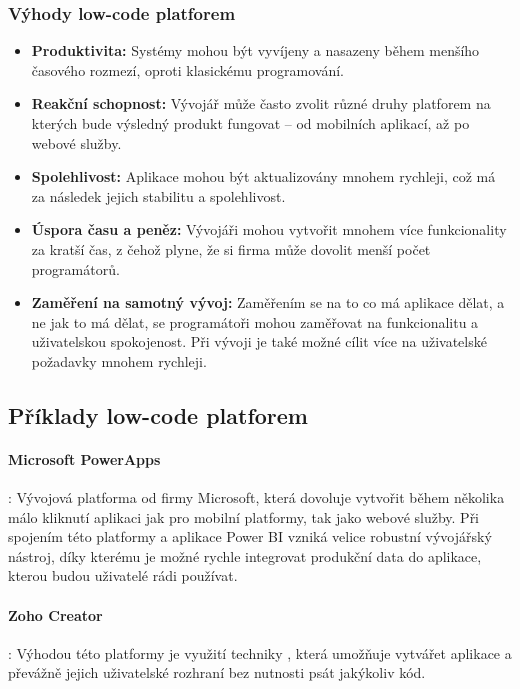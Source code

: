 \subsubsection{Výhody low-code platforem}
\begin{itemize}
\item \textbf{Produktivita:} Systémy mohou být vyvíjeny a nasazeny během menšího časového rozmezí, oproti klasickému programování. \cite{low-code-accelerate}
\item \textbf{Reakční schopnost:} Vývojář může často zvolit různé druhy platforem na kterých bude výsledný produkt fungovat -- od mobilních aplikací, až po webové služby. \cite{low-code-accelerate}
\item \textbf{Spolehlivost:} Aplikace mohou být aktualizovány mnohem rychleji, což má za následek jejich stabilitu a spolehlivost. \cite{low-code-accelerate}
\item \textbf{Úspora času a peněz:} Vývojáři mohou vytvořit mnohem více funkcionality za kratší čas, z čehož plyne, že si firma může dovolit menší počet programátorů. \cite{low-code-accelerate}
\item \textbf{Zaměření na samotný vývoj:} Zaměřením se na to co má aplikace dělat, a ne jak to má dělat, se programátoři mohou zaměřovat na funkcionalitu a uživatelskou spokojenost. Při vývoji je také možné cílit více na uživatelské požadavky mnohem rychleji. \cite{low-code-accelerate}
\end{itemize}

\subsection{Příklady low-code platforem}
\paragraph{Microsoft PowerApps}: Vývojová platforma od firmy Microsoft, která dovoluje vytvořit během několika málo kliknutí aplikaci jak pro mobilní platformy, tak jako webové služby. Při spojením této platformy a aplikace Power BI vzniká velice robustní vývojářský nástroj, díky kterému je možné rychle integrovat produkční data do aplikace, kterou budou uživatelé rádi používat. \cite{pcmag-no-coding}
\paragraph{Zoho Creator}: Výhodou této platformy je využití techniky , která umožňuje vytvářet aplikace a převážně jejich uživatelské rozhraní bez nutnosti psát jakýkoliv kód. \cite{zoho-review}
